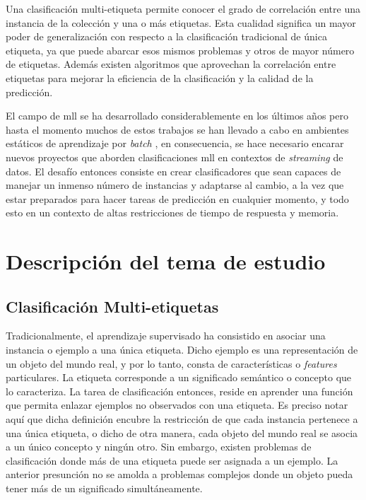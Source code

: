 Una clasificación multi-etiqueta permite conocer el grado de correlación entre
una instancia de la colección y una o más etiquetas. Esta cualidad significa un
mayor poder de generalización con respecto a la clasificación tradicional de
única etiqueta, ya que puede abarcar esos mismos problemas y otros de mayor
número de etiquetas. Además existen algoritmos que aprovechan la correlación
entre etiquetas para mejorar la eficiencia de la clasificación y la calidad de
la predicción.

El campo de \acrshort{mll} se ha desarrollado considerablemente en los últimos
años pero hasta el momento muchos de estos trabajos se han llevado a cabo en
ambientes estáticos de aprendizaje por \textit{batch}
\cite{read_classifier_2011}, en consecuencia, se hace necesario encarar nuevos
proyectos que aborden clasificaciones \acrshort{mll} en contextos de
\textit{streaming} de datos. El desafío entonces consiste en crear
clasificadores que sean capaces de manejar un inmenso número de instancias y
adaptarse al cambio, a la vez que estar preparados para hacer tareas de
predicción en cualquier momento, y todo esto en un contexto de altas
restricciones de tiempo de respuesta y memoria.

\section{Descripción del tema de estudio}

\subsection{Clasificación Multi-etiquetas}
\label{intro_mll}

Tradicionalmente, el aprendizaje supervisado ha consistido en asociar una
instancia o ejemplo a una única etiqueta. Dicho ejemplo es una representación de
un objeto del mundo real, y por lo tanto, consta de características o
\textit{features} particulares. La etiqueta corresponde a un significado
semántico o concepto que lo caracteriza. La tarea de clasificación entonces,
reside en aprender una función que permita enlazar ejemplos no observados con
una etiqueta. Es preciso notar aquí que dicha definición encubre la restricción
de que cada instancia pertenece a una única etiqueta, o dicho de otra manera,
cada objeto del mundo real se asocia a un único concepto y ningún otro. Sin
embargo, existen problemas de clasificación donde más de una etiqueta puede ser
asignada a un ejemplo. La anterior presunción no se amolda a problemas complejos
donde un objeto pueda tener más de un significado simultáneamente. 

